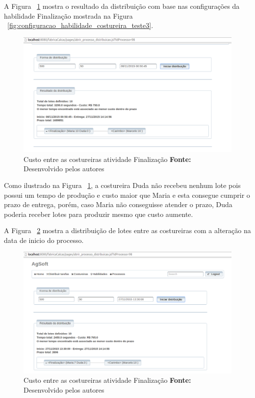 \par A Figura ~\ref{fig:resultado1_teste3} mostra o resultado da distribuição
com base nas configurações da habilidade Finalização mostrada na Figura
~\ref{fig:configuracao_habilidade_costureira_teste3}.

\begin{figure}[h!]
	\centerline{\includegraphics[scale=0.4]{./imagens/resultado1_teste3.png}}
	\caption[Custo entre as costureiras atividade Finalização]
	{Custo entre as costureiras atividade Finalização \textbf{Fonte:} Desenvolvido pelos autores}
	\label{fig:resultado1_teste3}
\end{figure}

\par Como ilustrado na Figura ~\ref{fig:resultado1_teste3}, a costureira Duda
não recebeu nenhum lote pois possui um tempo de produção e custo maior que Maria e
esta consegue cumprir o prazo de entrega, porém, caso Maria não conseguisse atender
o prazo, Duda poderia receber lotes para produzir mesmo que custo aumente.

A Figura ~\ref{fig:resultado2_teste3} mostra a distribuição de lotes entre as
costureiras com a alteração na data de inicio do processo.

\begin{figure}[h!]
	\centerline{\includegraphics[scale=0.4]{./imagens/resultado2_teste3.png}}
	\caption[Custo entre as costureiras atividade Finalização]
	{Custo entre as costureiras atividade Finalização \textbf{Fonte:} Desenvolvido pelos autores}
	\label{fig:resultado2_teste3}
\end{figure}

